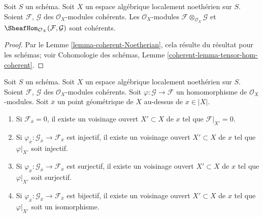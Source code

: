 \begin{lemma}
\label{lemma-tensor-hom-coherent}
Soit $S$ un schéma.
Soit $X$ un espace algébrique localement noethérien sur $S$.
Soient $\mathcal{F}$, $\mathcal{G}$ des $\mathcal{O}_X$-modules cohérents.
Les $\mathcal{O}_X$-modules $\mathcal{F} \otimes_{\mathcal{O}_X} \mathcal{G}$
et $\SheafHom_{\mathcal{O}_X}(\mathcal{F}, \mathcal{G})$ sont
cohérents.
\end{lemma}

\begin{proof}
Par le Lemme \ref{lemma-coherent-Noetherian}, cela résulte du résultat
pour les schémas; voir
Cohomologie des schémas, Lemme \ref{coherent-lemma-tensor-hom-coherent}.
\end{proof}

\begin{lemma}
\label{lemma-local-isomorphism}
Soit $S$ un schéma. Soit $X$ un espace algébrique localement noethérien sur $S$.
Soient $\mathcal{F}$, $\mathcal{G}$ des $\mathcal{O}_X$-modules cohérents.
Soit $\varphi : \mathcal{G} \to \mathcal{F}$ un homomorphisme
de $\mathcal{O}_X$-modules. Soit $\overline{x}$ un point géométrique de $X$
au-dessus de $x \in |X|$.
\begin{enumerate}
\item Si $\mathcal{F}_{\overline{x}} = 0$, il existe un voisinage
ouvert $X' \subset X$ de $x$ tel que $\mathcal{F}|_{X'} = 0$.
\item Si $\varphi_{\overline{x}} : \mathcal{G}_{\overline{x}} \to
\mathcal{F}_{\overline{x}}$ est injectif, il existe un voisinage
ouvert $X' \subset X$ de $x$ tel que $\varphi|_{X'}$ soit injectif.
\item Si $\varphi_{\overline{x}} : \mathcal{G}_{\overline{x}} \to
\mathcal{F}_{\overline{x}}$ est surjectif, il existe un voisinage
ouvert $X' \subset X$ de $x$ tel que $\varphi|_{X'}$ soit surjectif.
\item Si $\varphi_{\overline{x}} : \mathcal{G}_{\overline{x}} \to
\mathcal{F}_{\overline{x}}$ est bijectif, il existe un voisinage
ouvert $X' \subset X$ de $x$ tel que $\varphi|_{X'}$ soit un isomorphisme.
\end{enumerate}
\end{lemma}

